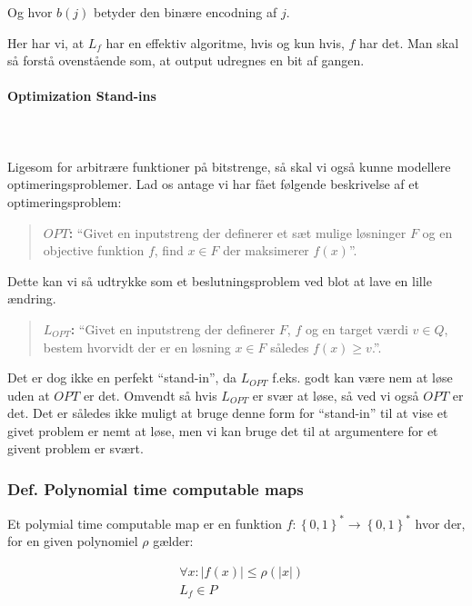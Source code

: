 Og hvor $b(j)$ betyder den binære encodning af $j$. 

Her har vi, at $L_f$ har en effektiv algoritme, hvis og kun hvis, $f$ har det. Man skal så forstå ovenstående som, at output udregnes en bit af gangen.

\paragraph{Optimization Stand-ins}
~\\
~\\
Ligesom for arbitrære funktioner på bitstrenge, så skal vi også kunne modellere optimeringsproblemer. Lad os antage vi har fået følgende beskrivelse af et optimeringsproblem:

\begin{quotation}
 \textbf{$OPT$:} ``Givet en inputstreng der definerer et sæt mulige løsninger $F$ og en objective funktion $f$, find $x \in F$ der maksimerer $f(x)$''.
\end{quotation}

Dette kan vi så udtrykke som et beslutningsproblem ved blot at lave en lille ændring.

\begin{quotation}
 \textbf{$L_{OPT}$:} ``Givet en inputstreng der definerer $F$, $f$ og en target værdi $v \in Q$, bestem hvorvidt der er en løsning $x \in F$ således $f(x) \geq v$.''.
\end{quotation}

Det er dog ikke en perfekt ``stand-in'', da $L_{OPT}$ f.eks. godt kan være nem at løse uden at $OPT$ er det. Omvendt så hvis $L_{OPT}$ er svær at løse, så ved vi også $OPT$ er det. Det er således ikke muligt at bruge denne form for ``stand-in'' til at vise et givet problem er nemt at løse, men vi kan bruge det til at argumentere for et givent problem er svært.



\subsubsection{Def. Polynomial time computable maps}

Et polymial time computable map er en funktion $f: \left\lbrace 0,1 \right\rbrace^* \rightarrow \left\lbrace 0,1 \right\rbrace^*$ hvor der, for en given polynomiel $\rho$ gælder:

\begin{align*}
 &\forall x: |f(x)| \leq \rho(|x|) \\
 &L_f	 \in P
\end{align*}

